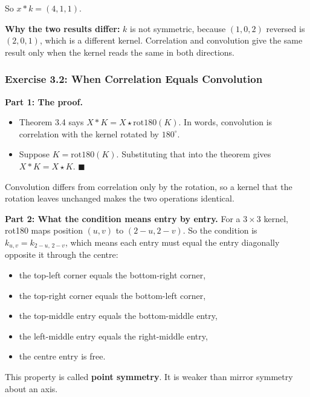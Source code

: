 So $x * k = (4, 1, 1)$.

\textbf{Why the two results differ:} $k$ is not symmetric, because $(1, 0, 2)$ reversed is $(2, 0, 1)$, which is a different kernel. Correlation and convolution give the same result only when the kernel reads the same in both directions.

\subsubsection*{Exercise 3.2: When Correlation Equals Convolution}

\textbf{Part 1: The proof.}
\begin{itemize}
  \item Theorem 3.4 says $X * K = X \star \mathrm{rot180}(K)$. In words, convolution is correlation with the kernel rotated by $180^\circ$.
  \item Suppose $K = \mathrm{rot180}(K)$. Substituting that into the theorem gives $X * K = X \star K$. $\blacksquare$
\end{itemize}

Convolution differs from correlation only by the rotation, so a kernel that the rotation leaves unchanged makes the two operations identical.

\textbf{Part 2: What the condition means entry by entry.}
For a $3\times 3$ kernel, rot180 maps position $(u, v)$ to $(2-u, 2-v)$. So the condition is $k_{u,v} = k_{2-u,\,2-v}$, which means each entry must equal the entry diagonally opposite it through the centre:
\begin{itemize}
  \item the top-left corner equals the bottom-right corner,
  \item the top-right corner equals the bottom-left corner,
  \item the top-middle entry equals the bottom-middle entry,
  \item the left-middle entry equals the right-middle entry,
  \item the centre entry is free.
\end{itemize}
This property is called \textbf{point symmetry}. It is weaker than mirror symmetry about an axis.

